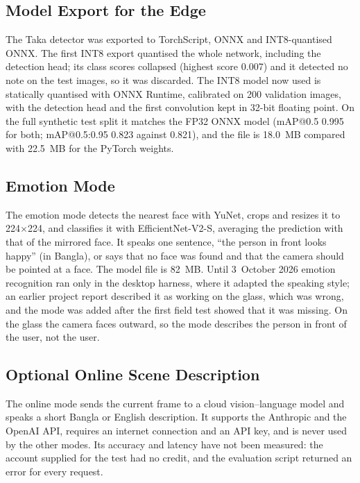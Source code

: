 \subsection*{Model Export for the Edge}
The Taka detector was exported to TorchScript, ONNX and INT8-quantised ONNX. The first INT8 export quantised the whole network, including the detection head; its class scores collapsed (highest score 0.007) and it detected no note on the test images, so it was discarded. The INT8 model now used is statically quantised with ONNX Runtime, calibrated on 200 validation images, with the detection head and the first convolution kept in 32-bit floating point. On the full synthetic test split it matches the FP32 ONNX model (mAP@0.5 0.995 for both; mAP@0.5:0.95 0.823 against 0.821), and the file is 18.0~MB compared with 22.5~MB for the PyTorch weights.

\subsection*{Emotion Mode}
The emotion mode detects the nearest face with YuNet, crops and resizes it to 224$\times$224, and classifies it with EfficientNet-V2-S, averaging the prediction with that of the mirrored face. It speaks one sentence, ``the person in front looks happy'' (in Bangla), or says that no face was found and that the camera should be pointed at a face. The model file is 82~MB. Until 3~October 2026 emotion recognition ran only in the desktop harness, where it adapted the speaking style; an earlier project report described it as working on the glass, which was wrong, and the mode was added after the first field test showed that it was missing. On the glass the camera faces outward, so the mode describes the person in front of the user, not the user.

\subsection*{Optional Online Scene Description}
The online mode sends the current frame to a cloud vision--language model and speaks a short Bangla or English description. It supports the Anthropic and the OpenAI API, requires an internet connection and an API key, and is never used by the other modes. Its accuracy and latency have not been measured: the account supplied for the test had no credit, and the evaluation script returned an error for every request.

